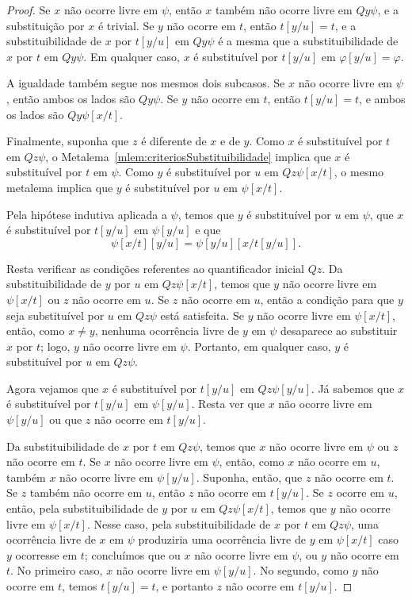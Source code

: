 \begin{proof}
    Se $x$ não ocorre livre em $\psi$, então $x$ também não ocorre livre em $Qy\psi$, e a substituição por $x$ é trivial.
    Se $y$ não ocorre em $t$, então $t[y/u]=t$, e a substituibilidade de $x$ por $t[y/u]$ em $Qy\psi$ é a mesma que a substituibilidade de $x$ por $t$ em $Qy\psi$.
    Em qualquer caso, $x$ é substituível por $t[y/u]$ em $\varphi[y/u]=\varphi$.

    A igualdade também segue nos mesmos dois subcasos.
    Se $x$ não ocorre livre em $\psi$, então ambos os lados são $Qy\psi$.
    Se $y$ não ocorre em $t$, então $t[y/u]=t$, e ambos os lados são $Qy\psi[x/t]$.

    Finalmente, suponha que $z$ é diferente de $x$ e de $y$.
    Como $x$ é substituível por $t$ em $Qz\psi$, o Metalema~\ref{mlem:criteriosSubstituibilidade} implica que $x$ é substituível por $t$ em $\psi$.
    Como $y$ é substituível por $u$ em $Qz\psi[x/t]$, o mesmo metalema implica que $y$ é substituível por $u$ em $\psi[x/t]$.

    Pela hipótese indutiva aplicada a $\psi$, temos que $y$ é substituível por $u$ em $\psi$, que $x$ é substituível por $t[y/u]$ em $\psi[y/u]$ e que
    \[
        \psi[x/t][y/u]=\psi[y/u][x/t[y/u]].
    \]

    Resta verificar as condições referentes ao quantificador inicial $Qz$.
    Da substituibilidade de $y$ por $u$ em $Qz\psi[x/t]$, temos que $y$ não ocorre livre em $\psi[x/t]$ ou $z$ não ocorre em $u$.
    Se $z$ não ocorre em $u$, então a condição para que $y$ seja substituível por $u$ em $Qz\psi$ está satisfeita.
    Se $y$ não ocorre livre em $\psi[x/t]$, então, como $x\neq y$, nenhuma ocorrência livre de $y$ em $\psi$ desaparece ao substituir $x$ por $t$; logo, $y$ não ocorre livre em $\psi$.
    Portanto, em qualquer caso, $y$ é substituível por $u$ em $Qz\psi$.

    Agora vejamos que $x$ é substituível por $t[y/u]$ em $Qz\psi[y/u]$.
    Já sabemos que $x$ é substituível por $t[y/u]$ em $\psi[y/u]$.
    Resta ver que $x$ não ocorre livre em $\psi[y/u]$ ou que $z$ não ocorre em $t[y/u]$.

    Da substituibilidade de $x$ por $t$ em $Qz\psi$, temos que $x$ não ocorre livre em $\psi$ ou $z$ não ocorre em $t$.
    Se $x$ não ocorre livre em $\psi$, então, como $x$ não ocorre em $u$, também $x$ não ocorre livre em $\psi[y/u]$.
    Suponha, então, que $z$ não ocorre em $t$.
    Se $z$ também não ocorre em $u$, então $z$ não ocorre em $t[y/u]$.
    Se $z$ ocorre em $u$, então, pela substituibilidade de $y$ por $u$ em $Qz\psi[x/t]$, temos que $y$ não ocorre livre em $\psi[x/t]$.
    Nesse caso, pela substituibilidade de $x$ por $t$ em $Qz\psi$, uma ocorrência livre de $x$ em $\psi$ produziria uma ocorrência livre de $y$ em $\psi[x/t]$ caso $y$ ocorresse em $t$; concluímos que ou $x$ não ocorre livre em $\psi$, ou $y$ não ocorre em $t$.
    No primeiro caso, $x$ não ocorre livre em $\psi[y/u]$.
    No segundo, como $y$ não ocorre em $t$, temos $t[y/u]=t$, e portanto $z$ não ocorre em $t[y/u]$.


\end{proof}
